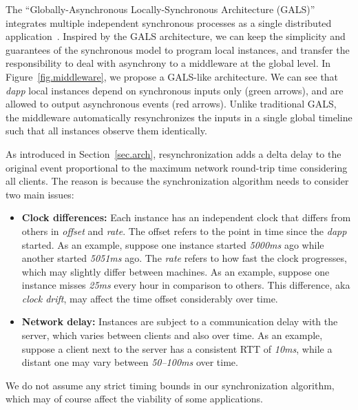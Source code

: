 \documentclass[sigplan,screen]{acmart}
\newcommand{\dapp}{\emph{dapp}\xspace}
\begin{document}
The ``Globally-Asynchronous Locally-Synchronous Architecture (GALS)''
integrates multiple independent synchronous processes as a single distributed
application~\cite{gals.taxonomy}.
%
Inspired by the GALS architecture, we can keep the simplicity and guarantees of
the synchronous model to program local instances, and transfer the
responsibility to deal with asynchrony to a middleware at the global level.
%
In Figure~\ref{fig.middleware}, we propose a GALS-like architecture.
We can see that \dapp local instances depend on synchronous inputs only (green
arrows), and are allowed to output asynchronous events (red arrows).
%
Unlike traditional GALS, the middleware automatically resynchronizes the
inputs in a single global timeline such that all instances observe them
identically.

As introduced in Section~\ref{sec.arch}, resynchronization adds a delta delay
to the original event proportional to the maximum network round-trip time
considering all clients.
The reason is because the synchronization algorithm needs to consider two main
issues:
%
\begin{itemize}
\item \textbf{Clock differences:}
    Each instance has an independent clock that differs from others in
    \emph{offset} and \emph{rate}.
    The offset refers to the point in time since the \dapp started.
    As an example, suppose one instance started \emph{5000ms} ago while another
    started \emph{5051ms} ago.
    The \emph{rate} refers to how fast the clock progresses, which may
    slightly differ between machines.
    As an example, suppose one instance misses \emph{25ms} every hour in
    comparison to others.
    This difference, aka \emph{clock drift}, may affect the time offset
    considerably over time.
\item \textbf{Network delay:}
    Instances are subject to a communication delay with the server, which
    varies between clients and also over time.
    As an example, suppose a client next to the server has a consistent RTT of
    \emph{10ms}, while a distant one may vary between \emph{50--100ms} over
    time.
\end{itemize}
%
We do not assume any strict timing bounds in our synchronization algorithm,
which may of course affect the viability of some applications.
\end{document}
